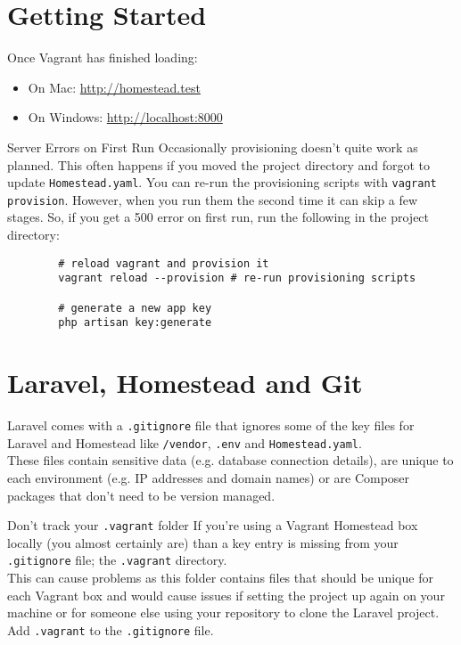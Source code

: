 \section{Getting Started}

Once Vagrant has finished loading:

\begin{itemize}
    \item On Mac: \href{http://homestead.test}{http://homestead.test}
    \item On Windows: \href{http://localhost:8000}{http://localhost:8000}
\end{itemize}



\begin{infobox}{Server Errors on First Run}
    Occasionally provisioning doesn't quite work as planned. This often happens if you moved the project directory and forgot to update \texttt{Homestead.yaml}. You can re-run the provisioning scripts with \texttt{vagrant provision}. However, when you run them the second time it can skip a few stages. So, if you get a 500 error on first run, run the following in the project directory:

    \begin{verbatim}
        # reload vagrant and provision it
        vagrant reload --provision # re-run provisioning scripts

        # generate a new app key
        php artisan key:generate
    \end{verbatim}
\end{infobox}

\section{Laravel, Homestead and Git}

Laravel comes with a \texttt{.gitignore} file that ignores some of the key files for Laravel and Homestead like \texttt{/vendor}, \texttt{.env} and \texttt{Homestead.yaml}.
\\

These files contain sensitive data (e.g. database connection details), are unique to each environment (e.g. IP addresses and domain names) or are Composer packages that don't need to be version managed.

\begin{infobox}{Don't track your \texttt{.vagrant} folder}
    If you're using a Vagrant Homestead box locally (you almost certainly are) than a key entry is missing from your \texttt{.gitignore} file; the \texttt{.vagrant} directory.
    \\
    
    This can cause problems as this folder contains files that should be unique for each Vagrant box and would cause issues if setting the project up again on your machine or for someone else using your repository to clone the Laravel project.
    \\

    Add \texttt{.vagrant} to the \texttt{.gitignore} file.
\end{infobox}

